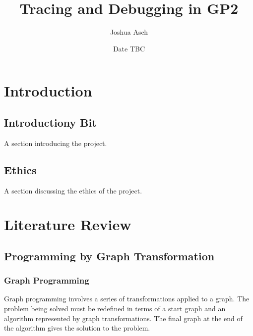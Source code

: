\documentclass[authoryearcitations]{UoYCSproject}
\author{Joshua Asch}
\title{Tracing and Debugging in GP2}
\date{Date TBC}
\begin{document}
\maketitle
\listoffigures
\listoftables

\cleardoublepage

\chapter{Introduction}
\label{cha:Introduction}

\section{Introductiony Bit}
\label{sec:IntroductionyBit}

A section introducing the project.

\section{Ethics}
\label{sec:Ethics}

A section discussing the ethics of the project.



\clearpage

\chapter{Literature Review}
\label{cha:LiteratureReview}


\section{Programming by Graph Transformation}
\label{sec:ProgrammingByGraphTransformation}


\subsection{Graph Programming}
\label{sec:GraphProgramming}

Graph programming involves a series of transformations applied to a graph. The
problem being solved must be redefined in terms of a start graph and an algorithm
represented by graph transformations. The final graph at the end of the algorithm
gives the solution to the problem.
\end{document}

